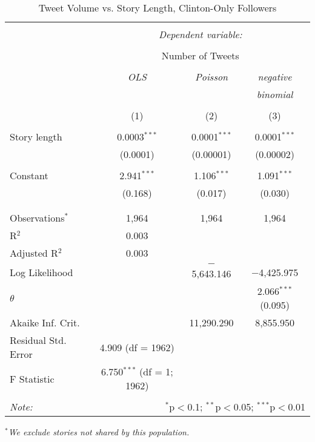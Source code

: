 \begin{table}[!htbp] \centering 
  \caption{Tweet Volume vs. Story Length, Clinton-Only Followers} 
  \label{} 
    \begin{tabular}{@{\extracolsep{5pt}}lccc} 
    \\[-1.8ex]\hline 
    \hline \\[-1.8ex] 
     & \multicolumn{3}{c}{\textit{Dependent variable:}} \\ 
    \cline{2-4} 
    \\[-1.8ex] & \multicolumn{3}{c}{Number of Tweets} \\ 
    \\[-1.8ex] & \textit{OLS} & \textit{Poisson} & \textit{negative} \\ 
     & \textit{} & \textit{} & \textit{binomial} \\ 
    \\[-1.8ex] & (1) & (2) & (3)\\ 
    \hline \\[-1.8ex] 
     Story length & 0.0003$^{***}$ & 0.0001$^{***}$ & 0.0001$^{***}$ \\ 
      & (0.0001) & (0.00001) & (0.00002) \\ 
      & & & \\ 
     Constant & 2.941$^{***}$ & 1.106$^{***}$ & 1.091$^{***}$ \\ 
      & (0.168) & (0.017) & (0.030) \\ 
      & & & \\ 
    \hline \\[-1.8ex] 
    Observations$^{*}$ & 1,964 & 1,964 & 1,964 \\ 
    R$^{2}$ & 0.003 &  &  \\ 
    Adjusted R$^{2}$ & 0.003 &  &  \\ 
    Log Likelihood &  & $-$5,643.146 & $-$4,425.975 \\ 
    $\theta$ &  &  & 2.066$^{***}$  (0.095) \\ 
    Akaike Inf. Crit. &  & 11,290.290 & 8,855.950 \\ 
    Residual Std. Error & 4.909 (df = 1962) &  &  \\ 
    F Statistic & 6.750$^{***}$ (df = 1; 1962) &  &  \\ 
    \hline 
    \hline \\[-1.8ex] 
    \textit{Note:}  & \multicolumn{3}{r}{$^{*}$p$<$0.1; $^{**}$p$<$0.05; $^{***}$p$<$0.01} \\ 
    \end{tabular} 
\end{table} 
\emph{$^{*}$We exclude stories not shared by this population.} 
\newpage 

